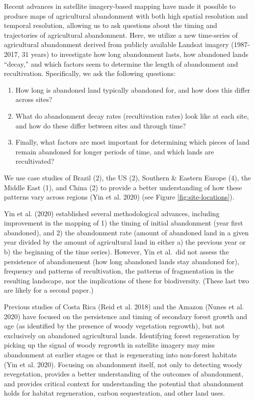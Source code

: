 \documentclass[
]{article}
\providecommand{\tightlist}{%
  \setlength{\itemsep}{0pt}\setlength{\parskip}{0pt}}
\begin{document}
Recent advances in satellite imagery-based mapping have made it possible to produce maps of agricultural abandonment with both high spatial resolution and temporal resolution, allowing us to ask questions about the timing and trajectories of agricultural abandonment.
Here, we utilize a new time-series of agricultural abandonment derived from publicly available Landsat imagery (1987-2017, 31 years) to investigate how long abandonment lasts, how abandoned lands ``decay,'' and which factors seem to determine the length of abandonment and recultivation.
Specifically, we ask the following questions:

\begin{enumerate}
\def\labelenumi{\arabic{enumi}.}
\tightlist
\item
  How long is abandoned land typically abandoned for, and how does this differ across sites?
\item
  What do abandonment decay rates (recultivation rates) look like at each site, and how do these differ between sites and through time?
\item
  Finally, what factors are most important for determining which pieces of land remain abandoned for longer periods of time, and which lands are recultivated?
\end{enumerate}

We use case studies of Brazil (2), the US (2), Southern \& Eastern Europe (4), the Middle East (1), and China (2) to provide a better understanding of how these patterns vary across regions (Yin et al. 2020) (see Figure \ref{fig:site-locations}).

Yin et al. (2020) established several methodological advances, including improvement in the mapping of 1) the timing of initial abandonment (year first abandoned), and 2) the abandonment rate (amount of abandoned land in a given year divided by the amount of agricultural land in either a) the previous year or b) the beginning of the time series). However, Yin et al.~did not assess the persistence of abandonement (how long abandoned lands stay abandoned for), frequency and patterns of recultivation, the patterns of fragmentation in the resulting landscape, nor the implications of these for biodiversity. (These last two are likely for a second paper.)

Previous studies of Costa Rica (Reid et al. 2018) and the Amazon (Nunes et al. 2020) have focused on the persistence and timing of secondary forest growth and age (as identified by the presence of woody vegetation regrowth), but not exclusively on abandoned agricultural lands.
Identifying forest regeneration by picking up the signal of woody regrowth in satellite imagery may miss abandonment at earlier stages or that is regenerating into non-forest habitats (Yin et al. 2020).
Focusing on abandonment itself, not only to detecting woody revegetation, provides a better understanding of the outcomes of abandonment, and provides critical context for understanding the potential that abandonment holds for habitat regeneration, carbon sequestration, and other land uses.
\end{document}
